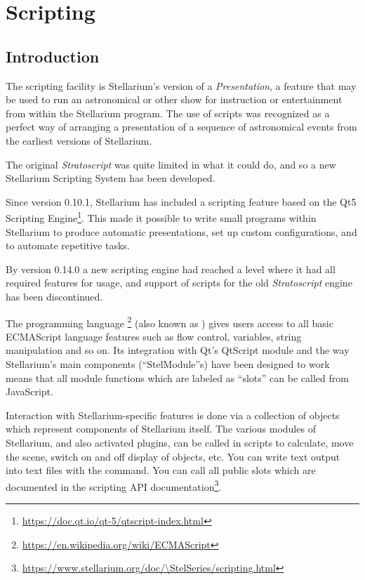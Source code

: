 
\chapter{Scripting}
\label{ch:scripting}


\section{Introduction}
\label{sec:scripting:introduction}

The scripting facility is Stellarium's version of a
\emph{Presentation}, a feature that may be used to run an astronomical
or other show for instruction or entertainment from within the
Stellarium program. The use of scripts was recognized as a perfect way 
of arranging a presentation of a sequence of astronomical events 
from the earliest versions of Stellarium. 

The original \emph{Stratoscript} was quite limited in what it could do, 
and so a new Stellarium Scripting System has been developed.

Since version 0.10.1, Stellarium has included a scripting feature based on
the Qt5 Scripting
Engine\footnote{\url{https://doc.qt.io/qt-5/qtscript-index.html}}. This
made it possible to write small programs within Stellarium to produce
automatic presentations, set up custom configurations, and to automate
repetitive tasks. 

By version 0.14.0 a new scripting engine had reached a level where
it had all required features for usage, and support of scripts for
the old \emph{Stratoscript} engine has been discontinued.

The programming language
\footnote{\url{https://en.wikipedia.org/wiki/ECMAScript}}
(also known as ) gives users access to all basic ECMAScript
language features such as flow control, variables, string manipulation
and so on. Its integration with Qt's QtScript module and the way Stellarium's main 
components (``StelModule''s) have been designed to work means that all module 
functions which are labeled as ``slots'' can be called from JavaScript.

Interaction with Stellarium-specific features is done via a collection
of objects which represent components of Stellarium itself.  The
various modules of Stellarium, and also activated plugins, can be
called in scripts to calculate, move the scene, switch on and off
display of objects, etc.  You can write text output into text files
with the  command.  You can call all public slots
which are documented in the scripting API documentation\footnote{
\url{https://www.stellarium.org/doc/\StelSeries/scripting.html}}.

